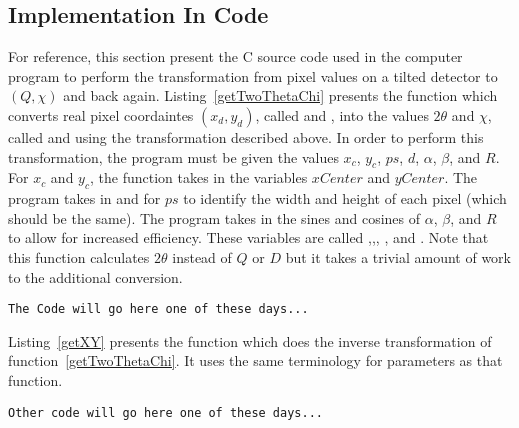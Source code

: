 \subsection{Implementation In Code}

For reference, this section present the C source 
code used in the computer program to perform the 
transformation from pixel values on a tilted 
detector to $(Q,\chi)$ and back again. 
Listing~\ref{getTwoThetaChi} presents the function
 which converts real pixel
coordaintes $(x_d,y_d)$, called 
and , into the values $2\theta$ and $\chi$, 
called  and  using the 
transformation described above. In order to perform 
this transformation, the program must be given
the values $x_c$, $y_c$, $ps$, $d$, 
$\alpha$, $\beta$, and $R$. For $x_c$ and $y_c$, 
the function takes in the variables $xCenter$ and
$yCenter$. The program takes in  
and  for $ps$ to identify the
width and height of each pixel (which should be the 
same). The program takes in the sines and cosines
of $\alpha$, $\beta$, and $R$ to allow for increased
efficiency. These variables are called 
,,,
, and . 
Note that this function calculates $2\theta$ instead
of $Q$ or $D$ but it takes a trivial amount of work
to the additional conversion.
\begin{lstlisting}[caption={The Code to convert pixel coordinates on a real detector into $(Q,\chi)$ coordinates},label=getTwoThetaChi]
The Code will go here one of these days...
\end{lstlisting}
Listing~\ref{getXY} presents the function  
which does the inverse transformation of 
function~\ref{getTwoThetaChi}. It uses the same
terminology for parameters as that function.

\begin{lstlisting}[caption={The Code to convert $(Q,\chi)$ values into pixel coordinates on a real detector},label=getXY]
Other code will go here one of these days...
\end{lstlisting}



